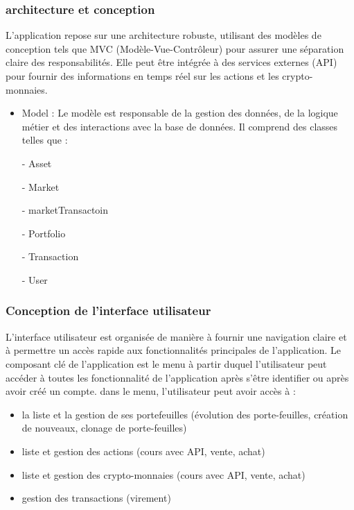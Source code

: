 \documentclass{article}
\begin{document}
\subsubsection{architecture et conception}

L'application repose sur une architecture robuste, utilisant des modèles de conception tels que MVC (Modèle-Vue-Contrôleur) pour assurer une séparation claire des responsabilités. Elle peut être intégrée à des services externes (API) pour fournir des informations en temps réel sur les actions et les crypto-monnaies.

\begin{itemize}
    \item Model : Le modèle est responsable de la gestion des données, de la logique métier et des interactions avec la base de données. Il comprend des classes telles que : 
    
    - Asset
    
    - Market
    
    - marketTransactoin
    
    - Portfolio
    
    - Transaction
    
    - User
    
\end{itemize}

\subsubsection{Conception de l'interface utilisateur}

L'interface utilisateur est organisée de manière à fournir une navigation claire et à permettre un accès rapide aux fonctionnalités principales de l'application. Le composant clé de l'application est le menu à partir duquel l'utilisateur peut accéder à toutes les fonctionnalité de l'application après s'être identifier ou après avoir créé un compte.
dans le menu, l'utilisateur peut avoir accès à :
\begin{itemize}
    \item la liste et la gestion de ses portefeuilles (évolution des porte-feuilles, création de nouveaux, clonage de porte-feuilles)
    \item liste et gestion des actions (cours avec API, vente, achat)
    \item liste et gestion des crypto-monnaies (cours avec API, vente, achat)
    \item gestion des transactions (virement)
\end{itemize}
\end{document}
